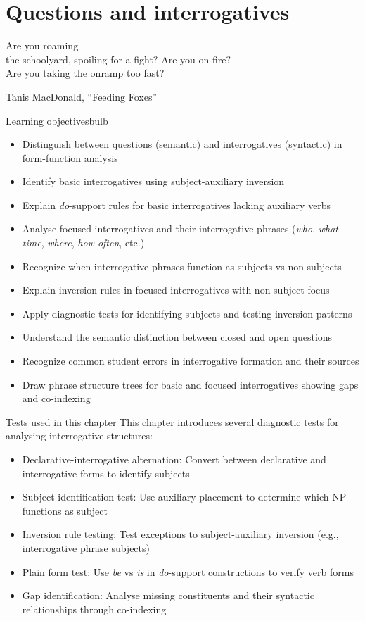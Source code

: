 \chapter{Questions and interrogatives} \label{ch:questions}

\epigraph{Are you roaming\\
the schoolyard, spoiling for a fight? Are you on fire?\\
Are you taking the onramp too fast?}{Tanis MacDonald, \enquote{Feeding Foxes}}

\begin{tblsframedsymbol}{Learning objectives}{bulb}
\begin{itemize}[noitemsep, leftmargin=*]
    \item Distinguish between questions (semantic) and interrogatives (syntactic) in form-function analysis
    \item Identify basic interrogatives using subject-auxiliary inversion
    \item Explain \emph{do}-support rules for basic interrogatives lacking auxiliary verbs
    \item Analyse focused interrogatives and their interrogative phrases (\emph{who}, \emph{what time}, \emph{where}, \emph{how often}, etc.)
    \item Recognize when interrogative phrases function as subjects vs non-subjects
    \item Explain inversion rules in focused interrogatives with non-subject focus
    \item Apply diagnostic tests for identifying subjects and testing inversion patterns
    \item Understand the semantic distinction between closed and open questions
    \item Recognize common student errors in interrogative formation and their sources
    \item Draw phrase structure trees for basic and focused interrogatives showing gaps and co-indexing
\end{itemize}
\end{tblsframedsymbol}

\begin{tblsfilled}{Tests used in this chapter}
This chapter introduces several diagnostic tests for analysing interrogative structures:
\begin{itemize}[noitemsep, leftmargin=*]
    \item Declarative-interrogative alternation: Convert between declarative and interrogative forms to identify subjects
    \item Subject identification test: Use auxiliary placement to determine which NP functions as subject
    \item Inversion rule testing: Test exceptions to subject-auxiliary inversion (e.g., interrogative phrase subjects)
    \item Plain form test: Use \emph{be} vs \emph{is} in \emph{do}-support constructions to verify verb forms
    \item Gap identification: Analyse missing constituents and their syntactic relationships through co-indexing
\end{itemize}
\end{tblsfilled}


